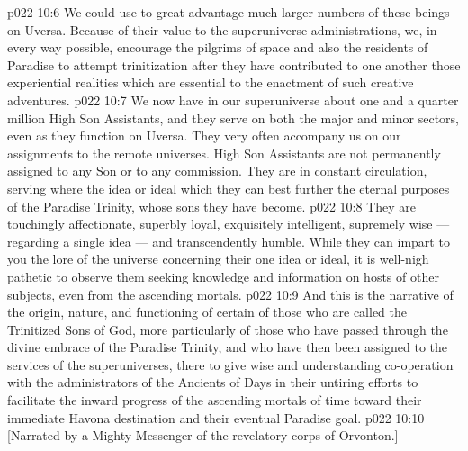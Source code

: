 \vs p022 10:6 We could use to great advantage much larger numbers of these beings on Uversa. Because of their value to the superuniverse administrations, we, in every way possible, encourage the pilgrims of space and also the residents of Paradise to attempt trinitization after they have contributed to one another those experiential realities which are essential to the enactment of such creative adventures.
\vs p022 10:7 \pc We now have in our superuniverse about one and a quarter million High Son Assistants, and they serve on both the major and minor sectors, even as they function on Uversa. They very often accompany us on our assignments to the remote universes. High Son Assistants are not permanently assigned to any Son or to any commission. They are in constant circulation, serving where the idea or ideal which they  can best further the eternal purposes of the Paradise Trinity, whose sons they have become.
\vs p022 10:8 They are touchingly affectionate, superbly loyal, exquisitely intelligent, supremely wise --- regarding a single idea --- and transcendently humble. While they can impart to you the lore of the universe concerning their one idea or ideal, it is well\hyp{}nigh pathetic to observe them seeking knowledge and information on hosts of other subjects, even from the ascending mortals.
\vs p022 10:9 \pc And this is the narrative of the origin, nature, and functioning of certain of those who are called the Trinitized Sons of God, more particularly of those who have passed through the divine embrace of the Paradise Trinity, and who have then been assigned to the services of the superuniverses, there to give wise and understanding co\hyp{}operation with the administrators of the Ancients of Days in their untiring efforts to facilitate the inward progress of the ascending mortals of time toward their immediate Havona destination and their eventual Paradise goal.
\vsetoff
\vs p022 10:10 [Narrated by a Mighty Messenger of the revelatory corps of Orvonton.]
\quizlink
